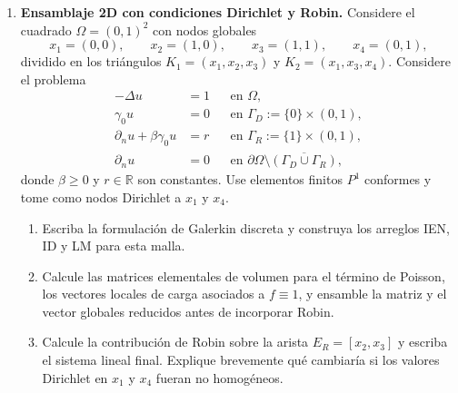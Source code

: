 \documentclass[11pt]{article}
\theoremstyle{thmstyle}
\def\R{\mathbb R}
\begin{document}
\begin{enumerate}[label=\textbf{\arabic*.}, leftmargin=*]
    \item \textbf{Ensamblaje 2D con condiciones Dirichlet y Robin.} Considere el cuadrado $\Omega=(0,1)^2$ con nodos globales
    \[
        x_1=(0,0),\qquad x_2=(1,0),\qquad x_3=(1,1),\qquad x_4=(0,1),
    \]
    dividido en los tri\'angulos $K_1=(x_1,x_2,x_3)$ y $K_2=(x_1,x_3,x_4)$. Considere el problema
    \[
    \begin{aligned}
        -\Delta u &= 1 &&\text{en }\Omega,\\
        \gamma_0u &=0 &&\text{en }\Gamma_D:=\{0\}\times(0,1),\\
        \partial_nu+\beta\gamma_0u &= r &&\text{en }\Gamma_R:=\{1\}\times(0,1),\\
        \partial_nu&=0 &&\text{en }\partial\Omega\setminus\overline{(\Gamma_D\cup\Gamma_R)},
    \end{aligned}
    \]
    donde $\beta\ge 0$ y $r\in\R$ son constantes. Use elementos finitos $P^1$ conformes y tome como nodos Dirichlet a $x_1$ y $x_4$.
    \begin{enumerate}[label=(\alph*)]
        \item Escriba la formulaci\'on de Galerkin discreta y construya los arreglos IEN, ID y LM para esta malla.
        \item Calcule las matrices elementales de volumen para el t\'ermino de Poisson, los vectores locales de carga asociados a $f\equiv 1$, y ensamble la matriz y el vector globales reducidos antes de incorporar Robin.
        \item Calcule la contribuci\'on de Robin sobre la arista $E_R=[x_2,x_3]$ y escriba el sistema lineal final. Explique brevemente qu\'e cambiar\'ia si los valores Dirichlet en $x_1$ y $x_4$ fueran no homog\'eneos.
    \end{enumerate}

\end{enumerate}
\end{document}
